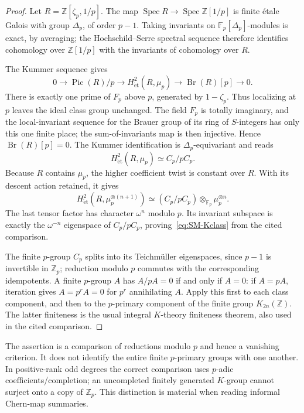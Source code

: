 \begin{proof}
Let $R=\mathbb Z[\zeta_p,1/p]$.  The map
$\operatorname{Spec}R\to\operatorname{Spec}\mathbb Z[1/p]$ is finite
\'etale Galois with group $\Delta_p$, of order $p-1$.  Taking invariants
on $\mathbb F_p[\Delta_p]$-modules is exact, by averaging; the
Hochschild--Serre spectral sequence therefore identifies cohomology over
$\mathbb Z[1/p]$ with the invariants of cohomology over $R$.

The Kummer sequence gives
\[
 0\longrightarrow\operatorname{Pic}(R)/p
 \longrightarrow H^2_{\mathrm{\acute et}}(R,\mu_p)
 \longrightarrow\operatorname{Br}(R)[p]\longrightarrow0.
\]
There is exactly one prime of $F_p$ above $p$, generated by
$1-\zeta_p$.  Thus localizing at $p$ leaves the ideal class group
unchanged.  The field $F_p$ is totally imaginary, and the local-invariant
sequence for the Brauer group of its ring of $S$-integers has only this
one finite place; the sum-of-invariants map is then injective.  Hence
$\operatorname{Br}(R)[p]=0$.  The Kummer identification is
$\Delta_p$-equivariant and reads
\[
 H^2_{\mathrm{\acute et}}(R,\mu_p)
       \simeq C_p/pC_p.
\]
Because $R$ contains $\mu_p$, the higher coefficient twist is constant
over $R$.  With its descent action retained, it gives
\[
 H^2_{\mathrm{\acute et}}(R,\mu_p^{\otimes(n+1)})
 \simeq (C_p/pC_p)\otimes_{\mathbb F_p}\mu_p^{\otimes n}.
\]
The last tensor factor has character $\omega^n$ modulo $p$.
Its invariant subspace is exactly the $\omega^{-n}$ eigenspace of
$C_p/pC_p$, proving~\eqref{eq:SM-Kclass} from the cited comparison.

The finite $p$-group $C_p$ splits into its Teichm\"uller eigenspaces,
since $p-1$ is invertible in $\mathbb Z_p$; reduction modulo $p$ commutes
with the corresponding idempotents.  A finite $p$-group $A$ has
$A/pA=0$ if and only if $A=0$: if $A=pA$, iteration gives
$A=p^rA=0$ for $p^r$ annihilating $A$.  Apply this first to each class
component, and then to the $p$-primary component of the finite group
$K_{2n}(\mathbb Z)$.  The latter finiteness is the usual integral
$K$-theory finiteness theorem, also used in the cited comparison.
\end{proof}

The assertion is a comparison of reductions modulo $p$ and hence a
vanishing criterion.  It does not identify the entire finite
$p$-primary groups with one another.  In positive-rank odd degrees the
correct comparison uses $p$-adic coefficients/completion; an
uncompleted finitely generated $K$-group cannot surject onto a copy of
$\mathbb Z_p$.  This distinction is material when reading informal
Chern-map summaries.

